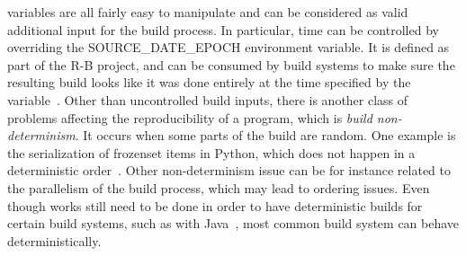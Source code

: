 \documentclass[a4paper,11pt,oneside]{report}
\theoremstyle{definition}
\newcommand{\sde}{SOURCE\_DATE\_EPOCH\xspace}
\begin{document}
variables are all fairly easy to manipulate and can be considered as valid
additional input for the build process. In particular, time can be controlled
by overriding the \sde environment variable. It is defined as part of the R-B
project, and can be consumed by build systems to make sure the resulting build
looks like it was done entirely at the time specified by the variable~\cite{rb:sde}.
Other than uncontrolled build inputs, there is another class of problems
affecting the reproducibility of a program, which is \emph{build
non-determinism}. It occurs when some parts of the build are random. One example
is the serialization of frozenset items in Python, which does not happen in a
deterministic order~\cite{gh:pyc-frozenset}. Other non-determinism issue can be
for instance related to the parallelism of the build process, which may lead to
ordering issues. Even though works still need to be done in order to have
deterministic builds for certain build systems, such as with
Java~\cite{xiong2022towards}, most common build system can behave
deterministically.
\end{document}
